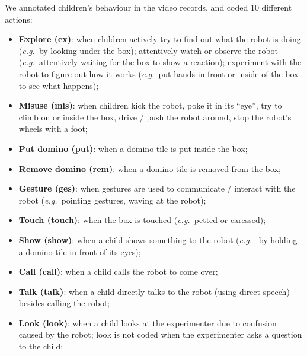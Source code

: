 \documentclass{sig-alternate}
\newcommand{\eg}{{\textit{e.g.~}}}
\begin{document}
We annotated children's behaviour in the video records, and coded 10 different
actions:

\begin{itemize}

    \item \textbf{Explore (ex)}: when children actively try to find out what the
        robot is doing (\eg by looking under the box); attentively watch or
        observe the robot (\eg attentively waiting for the box to show a
        reaction); experiment with the robot to figure out how it works (\eg put
        hands in front or inside of the box to see what happens);

    \item \textbf{Misuse (mis)}: when children kick the robot, poke it in its
        ``eye'', try to climb on or inside the box, drive / push the robot
        around, stop the robot's wheels with a foot;

    \item \textbf{Put domino (put)}: when a domino tile is put inside the box;

    \item \textbf{Remove domino (rem)}: when a domino tile is removed from the
        box;

    \item \textbf{Gesture (ges)}: when gestures are used to communicate /
        interact with the robot (\eg pointing gestures, waving at the robot);

    \item \textbf{Touch (touch)}: when the box is touched (\eg petted or
        caressed);

    \item \textbf{Show (show)}: when a child shows something to the robot (\eg
        by holding a domino tile in front of its eyes);

    \item \textbf{Call (call)}: when a child calls the robot to come over;

    \item \textbf{Talk (talk)}: when a child directly talks to the robot (using
        direct speech) besides calling the robot;

    \item \textbf{Look (look)}:	when a child looks at the experimenter due to
        confusion caused by the robot; look is not coded when the experimenter
        asks a question to the child;

\end{itemize}
\end{document}
